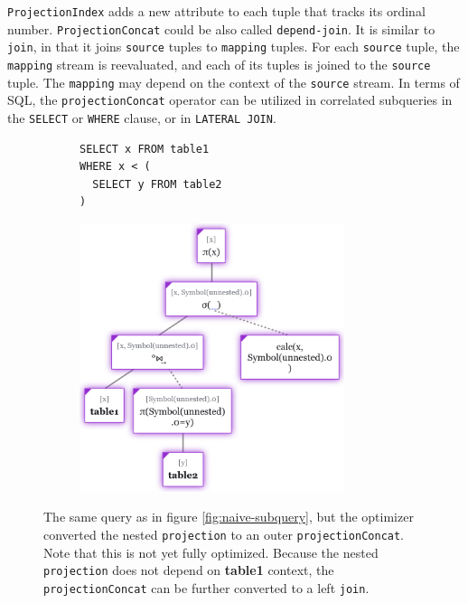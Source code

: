 \texttt{ProjectionIndex} adds a new attribute to each tuple that tracks its ordinal number. \texttt{ProjectionConcat} could be also called \texttt{depend-join}. It is similar to \texttt{join}, in that it joins \texttt{source} tuples to \texttt{mapping} tuples. For each \texttt{source} tuple, the \texttt{mapping} stream is reevaluated, and each of its tuples is joined to the \texttt{source} tuple. The \texttt{mapping} may depend on the context of the \texttt{source} stream. In terms of SQL, the \texttt{projectionConcat} operator can be utilized in correlated subqueries in the \texttt{SELECT} or \texttt{WHERE} clause, or in \texttt{LATERAL JOIN}.

\begin{figure}[htpb]
    \begin{subfigure}[b]{\textwidth}
    \begin{tcolorbox}[colback=white, colframe=black, boxrule=1pt, arc=0pt]
        \begin{verbatim}
SELECT x FROM table1
WHERE x < (
  SELECT y FROM table2
)
        \end{verbatim}
    \end{tcolorbox}
    \end{subfigure}
    
    \medskip
    
    \begin{subfigure}[b]{\textwidth}
        \centering
        \includegraphics[width=220pt]{img/tree-projconcat-subquery.png}
    \end{subfigure}
    
    \caption{The same query as in figure \ref{fig:naive-subquery}, but the optimizer converted the nested \texttt{projection} to an outer \texttt{projectionConcat}. Note that this is not yet fully optimized. Because the nested \texttt{projection} does not depend on \textbf{table1} context, the \texttt{projectionConcat} can be further converted to a left \texttt{join}.}
\end{figure}

